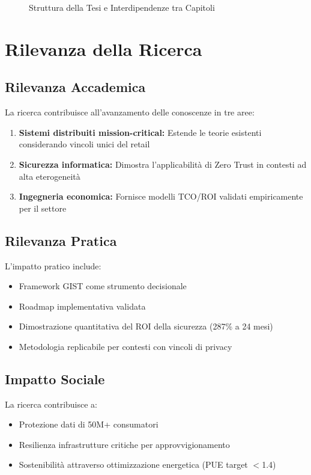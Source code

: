 \begin{figure}[H]
\centering
{}
\caption{Struttura della Tesi e Interdipendenze tra Capitoli}
\end{figure}

\section{Rilevanza della Ricerca}

\subsection{Rilevanza Accademica}

La ricerca contribuisce all'avanzamento delle conoscenze in tre aree:
\begin{enumerate}
\item \textbf{Sistemi distribuiti mission-critical:} Estende le teorie esistenti considerando vincoli unici del retail
\item \textbf{Sicurezza informatica:} Dimostra l'applicabilità di Zero Trust in contesti ad alta eterogeneità
\item \textbf{Ingegneria economica:} Fornisce modelli TCO/ROI validati empiricamente per il settore
\end{enumerate}

\subsection{Rilevanza Pratica}

L'impatto pratico include:
\begin{itemize}
\item Framework GIST come strumento decisionale
\item Roadmap implementativa validata
\item Dimostrazione quantitativa del ROI della sicurezza (287\% a 24 mesi)
\item Metodologia replicabile per contesti con vincoli di privacy
\end{itemize}

\subsection{Impatto Sociale}

La ricerca contribuisce a:
\begin{itemize}
\item Protezione dati di 50M+ consumatori
\item Resilienza infrastrutture critiche per approvvigionamento
\item Sostenibilità attraverso ottimizzazione energetica (PUE target $<$1.4)
\end{itemize}
